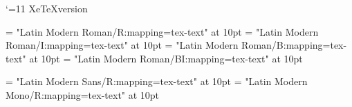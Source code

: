 \catcode`\@=11
\ifcsname XeTeXversion\endcsname
  \ifdefined\textfontopt\else\def\textfontopt{mapping=tex-text}\fi
\else
\fi
\outer\def\newfam{\alloc@8\fam\chardef\@cclv}

\newdimen\um@tempdima
\newdimen\um@tempdimb
\newdimen\um@tempdimc
\newdimen\um@tempdimd

\ifdefined\mainfontname\else
  \gdef\mainfontname{Latin Modern Roman}
\fi
\ifdefined\sansfontname\else
  \gdef\sansfontname{Latin Modern Sans}
\fi
\ifdefined\monofontname\else
  \gdef\monofontname{Latin Modern Mono}
\fi

\font\tenrm     =  "\mainfontname/R:\textfontopt" at 10pt
\font\tenit     =  "\mainfontname/I:\textfontopt" at 10pt
\font\tenbf     =  "\mainfontname/B:\textfontopt" at 10pt
\font\tenbfit   = "\mainfontname/BI:\textfontopt" at 10pt
\newdimen\sf@size
\newdimen\tt@size

\font\tensf@test = "\sansfontname/R:\textfontopt" at 10pt
\font\tentt@test = "\monofontname/R:\textfontopt" at 10pt
\um@tempdima{}\tenrm
\um@tempdimb{}\tensf@test
\gdef\sf@innerratio{\numexpr\dimexpr256\um@tempdima/\um@tempdimb\relax}
\um@tempdimc{}\tentt@test
\gdef\tt@innerratio{\numexpr\dimexpr256\um@tempdima/\um@tempdimc\relax}
\let\tensf@test\relax \let\tentt@test\relax


